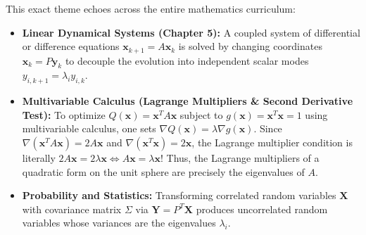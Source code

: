 \documentclass[11pt, letterpaper]{article}
\theoremstyle{definition}
\theoremstyle{remark}
\begin{document}
This exact theme echoes across the entire mathematics curriculum:
\begin{itemize}
    \item \textbf{Linear Dynamical Systems (Chapter 5):} A coupled system of differential or difference equations $\mathbf{x}_{k+1} = A\mathbf{x}_k$ is solved by changing coordinates $\mathbf{x}_k = P\mathbf{y}_k$ to decouple the evolution into independent scalar modes $y_{i, k+1} = \lambda_i y_{i,k}$.
    \item \textbf{Multivariable Calculus (Lagrange Multipliers \& Second Derivative Test):} To optimize $Q(\mathbf{x}) = \mathbf{x}^T A \mathbf{x}$ subject to $g(\mathbf{x}) = \mathbf{x}^T\mathbf{x} = 1$ using multivariable calculus, one sets $\nabla Q(\mathbf{x}) = \lambda \nabla g(\mathbf{x})$. Since $\nabla (\mathbf{x}^T A \mathbf{x}) = 2A\mathbf{x}$ and $\nabla (\mathbf{x}^T\mathbf{x}) = 2\mathbf{x}$, the Lagrange multiplier condition is literally $2A\mathbf{x} = 2\lambda \mathbf{x} \iff A\mathbf{x} = \lambda \mathbf{x}$! Thus, the Lagrange multipliers of a quadratic form on the unit sphere are precisely the eigenvalues of $A$.
    \item \textbf{Probability and Statistics:} Transforming correlated random variables $\mathbf{X}$ with covariance matrix $\Sigma$ via $\mathbf{Y} = P^T \mathbf{X}$ produces uncorrelated random variables whose variances are the eigenvalues $\lambda_i$.
\end{itemize}
\end{document}

